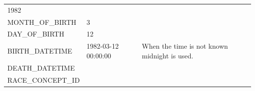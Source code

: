\documentclass[]{book}
\begin{document}
\begin{longtable}[]{@{}lll@{}}
\begin{minipage}[t]{0.16\columnwidth}
1982\strut
\end{minipage} & \begin{minipage}[t]{0.42\columnwidth}\raggedright\strut
\strut
\end{minipage}\tabularnewline
\begin{minipage}[t]{0.33\columnwidth}\raggedright\strut
MONTH\_OF\_BIRTH\strut
\end{minipage} & \begin{minipage}[t]{0.16\columnwidth}\raggedright\strut
3\strut
\end{minipage} & \begin{minipage}[t]{0.42\columnwidth}\raggedright\strut
\strut
\end{minipage}\tabularnewline
\begin{minipage}[t]{0.33\columnwidth}\raggedright\strut
DAY\_OF\_BIRTH\strut
\end{minipage} & \begin{minipage}[t]{0.16\columnwidth}\raggedright\strut
12\strut
\end{minipage} & \begin{minipage}[t]{0.42\columnwidth}\raggedright\strut
\strut
\end{minipage}\tabularnewline
\begin{minipage}[t]{0.33\columnwidth}\raggedright\strut
BIRTH\_DATETIME\strut
\end{minipage} & \begin{minipage}[t]{0.16\columnwidth}\raggedright\strut
1982-03-12 00:00:00\strut
\end{minipage} & \begin{minipage}[t]{0.42\columnwidth}\raggedright\strut
When the time is not known midnight is used.\strut
\end{minipage}\tabularnewline
\begin{minipage}[t]{0.33\columnwidth}\raggedright\strut
DEATH\_DATETIME\strut
\end{minipage} & \begin{minipage}[t]{0.16\columnwidth}\raggedright\strut
\strut
\end{minipage} & \begin{minipage}[t]{0.42\columnwidth}\raggedright\strut
\strut
\end{minipage}\tabularnewline
\begin{minipage}[t]{0.33\columnwidth}\raggedright\strut
RACE\_CONCEPT\_ID\strut
\end{minipage} & \begin{minipage}[t]{0.16\columnwidth}\raggedright\strut

\end{minipage}
\end{longtable}
\end{document}
